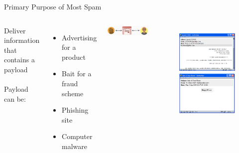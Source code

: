 \documentclass[nobackground,dvipsnames,table,aspectratio=169]{beamer}
\begin{document}
\begin{frame}{Primary Purpose of Most Spam}
    \begin{columns}
            Deliver information that contains a payload\\~\\
            Payload can be:\\
            \begin{itemize}
                \item Advertising for a product
                \item Bait for a fraud scheme
                \item Phishing site
                \item Computer malware
            \end{itemize}
            \vspace{0.1\textheight}
            \includegraphics[width=\textwidth]{spam-diagram}
            \begin{figure}
                \centering
                \includegraphics[width=\textwidth]{spam-payload-ad}
                \includegraphics[width=\textwidth]{spam-payload-exe}

\end{figure}
\end{columns}
\end{frame}
\end{document}
